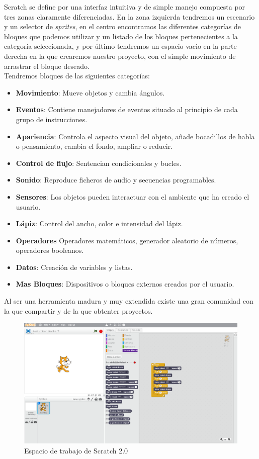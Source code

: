 Scratch se define por una interfaz intuitiva y de simple manejo compuesta por tres zonas claramente diferenciadas. En la zona izquierda tendremos un escenario y un selector de \textit{sprites}, en el centro encontramos las diferentes categorías de bloques que podemos utilizar y un listado de los bloques pertenecientes a la categoría seleccionada, y por último tendremos un espacio vacio en la parte derecha en la que crearemos nuestro proyecto, con el simple movimiento de arrastrar el bloque deseado.\\

Tendremos bloques de las siguientes categorías:
\begin{itemize}
\item \textbf{Movimiento}: Mueve objetos y cambia ángulos.	  	 	
\item \textbf{Eventos}: Contiene manejadores de eventos situado al principio de cada grupo de instrucciones.
\item \textbf{Apariencia}: Controla el aspecto visual del objeto, añade bocadillos de habla o 
pensamiento, cambia el fondo, ampliar o reducir.	 	
\item \textbf{Control de flujo}: Sentencian condicionales y bucles. 
\item \textbf{Sonido}: Reproduce ficheros de audio y secuencias programables.	 	
\item \textbf{Sensores}: Los objetos pueden interactuar con el ambiente que ha creado el usuario.
\item \textbf{Lápiz}: Control del ancho, color e intensidad del lápiz.	 	
\item \textbf{Operadores} Operadores matemáticos, generador aleatorio de números, operadores booleanos.
\item \textbf{Datos}: Creación de variables y listas.	 	
\item \textbf{Mas Bloques}: Dispositivos o bloques externos creados por el usuario.
\end{itemize}

Al ser una herramienta madura y muy extendida existe una gran comunidad con la que compartir y de la que obtenter proyectos.

\begin{figure}[H]
    \centering
    \includegraphics[scale=0.32]{img/scratch_IDE.png}
  	\caption{Espacio de trabajo de Scratch 2.0}
  	\label{fig:gazebo}
\end{figure}

